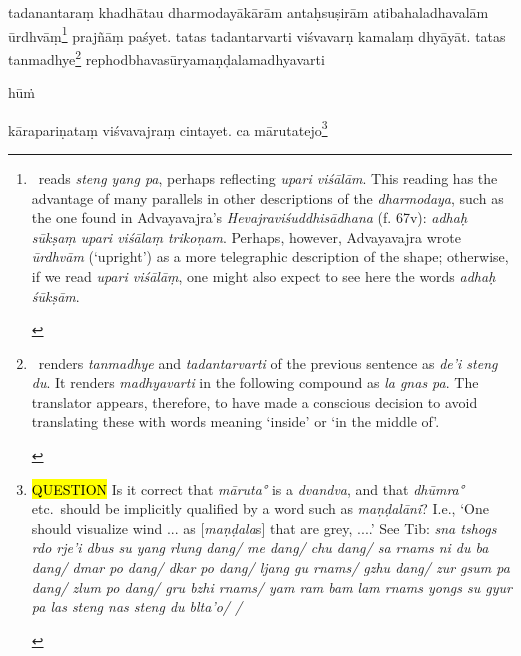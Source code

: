 \documentclass[naipra.tex]{subfiles}
\begin{document}
\begin{sanskrit}

\pstart
tadanantaraṃ khadhātau dharmodayākārām antaḥsuṣirām atibahaladhavalām ūrdhvāṃ\footnote{\begin{english}
	\TIB\ reads \emph{steng yang pa}, perhaps reflecting \emph{upari viśālām}.
	This reading has the advantage of many parallels in other descriptions of the \emph{dharmodaya}, such as the one found in Advayavajra's \emph{Hevajraviśuddhisādhana} (f. 67v): \emph{adhaḥ sūkṣaṃ upari viśālaṃ trikoṇam}.
	Perhaps, however, Advayavajra wrote \emph{ūrdhvām} (`upright') as a more telegraphic description of the shape; otherwise, if we read \emph{upari viśālāṃ}, one might also expect to see here the words \emph{adhaḥ śūkṣām}. 
\end{english}} prajñāṃ paśyet.
tatas tadantarvarti viśvavarṇ  kamalaṃ dhyāyāt.
tatas tanmadhye\footnote{\begin{english}
	\TIB\ renders \emph{tanmadhye} and \emph{tadantarvarti} of the previous sentence as \emph{de'i steng du}.
	It renders \emph{madhyavarti} in the following compound as \emph{la gnas pa}.  
	The translator appears, therefore, to have made a conscious decision to avoid translating these with words meaning `inside' or `in the middle of'.
\end{english}} rephodbhavasūryamaṇḍalamadhyavarti\dsh \begin{mantra}hūṁ\end{mantra}\dsh kārapariṇataṃ viśvavajraṃ cintayet. 
 ca mārutatejo\footnote{\begin{english}
	\hl{QUESTION} Is it correct that \emph{māruta°} is a \emph{dvandva}, and that \emph{dhūmra°} etc.\ should be implicitly qualified by a word such as \emph{maṇḍalāni}? I.e., `One should visualize wind ... as [\emph{maṇḍala}s] that are grey, ....' See Tib: \emph{sna tshogs rdo rje'i dbus su yang rlung dang/ me dang/ chu dang/ sa rnams ni du ba dang/ dmar po dang/ dkar po dang/ ljang gu rnams/ gzhu dang/ zur gsum pa dang/ zlum po dang/ gru bzhi rnams/ yam ram bam lam rnams yongs su gyur pa las steng nas steng du blta'o/ /}

\end{english}}
\end{sanskrit}
\end{document}
